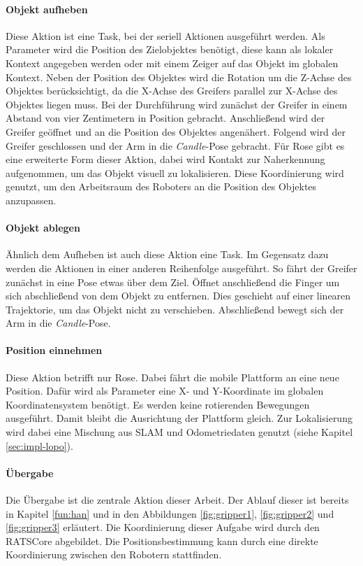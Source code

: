 \paragraph{Objekt aufheben} Diese Aktion ist eine Task, bei der seriell Aktionen ausgeführt werden. Als Parameter wird die Position des Zielobjektes benötigt, diese kann als lokaler Kontext angegeben werden oder mit einem Zeiger auf das Objekt im globalen Kontext. Neben der Position des Objektes wird die Rotation um die Z-Achse des Objektes berücksichtigt, da die X-Achse des Greifers parallel zur X-Achse des Objektes liegen muss. Bei der Durchführung wird zunächst der Greifer in einem Abstand von vier Zentimetern in Position gebracht. Anschließend wird der Greifer geöffnet und an die Position des Objektes angenähert. Folgend wird der Greifer geschlossen und der Arm in die \textit{Candle}-Pose gebracht. Für Rose gibt es eine erweiterte Form dieser Aktion, dabei wird Kontakt zur Naherkennung aufgenommen, um das Objekt visuell zu lokalisieren. Diese Koordinierung wird genutzt, um den Arbeitsraum des Roboters an die Position des Objektes anzupassen.

\paragraph{Objekt ablegen} Ähnlich dem Aufheben ist auch diese Aktion eine Task. Im Gegensatz dazu werden die Aktionen in einer anderen Reihenfolge ausgeführt. So fährt der Greifer zunächst in eine Pose etwas über dem Ziel. Öffnet anschließend die Finger um sich abschließend von dem Objekt zu entfernen. Dies geschieht auf einer linearen Trajektorie, um das Objekt nicht zu verschieben. Abschließend bewegt sich der Arm in die \textit{Candle}-Pose.

\paragraph{Position einnehmen}
Diese Aktion betrifft nur Rose. Dabei fährt die mobile Plattform an eine neue Position. Dafür wird als Parameter eine X- und Y-Koordinate im globalen Koordinatensystem benötigt. Es werden keine rotierenden Bewegungen ausgeführt. Damit bleibt die Ausrichtung der Plattform gleich. Zur Lokalisierung wird dabei eine Mischung aus SLAM und Odometriedaten genutzt (siehe Kapitel \ref{sec:impl-lopo}).

\paragraph{Übergabe} Die Übergabe ist die zentrale Aktion dieser Arbeit. Der Ablauf dieser ist bereits in Kapitel \ref{fun:han} und in den Abbildungen \ref{fig:gripper1}, \ref{fig:gripper2} und \ref{fig:gripper3} erläutert. Die Koordinierung dieser Aufgabe wird durch den RATSCore abgebildet. Die Positionsbestimmung kann durch eine direkte Koordinierung zwischen den Robotern stattfinden.

